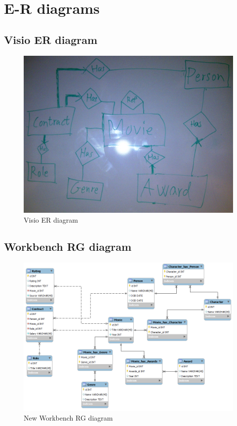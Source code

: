 \section{E-R diagrams}
\subsection{Visio ER diagram}
\begin{figure}[h!]
\includegraphics[width=\textwidth,natwidth=2005,natheight=1506]{illustrations/ER.jpg}
  \caption{Visio ER diagram}
\end{figure}
\subsection{Workbench RG diagram}
\begin{figure}[h!]
\includegraphics[width=\textwidth,natwidth=940,natheight=670]{illustrations/RG.png}
  \caption{New Workbench RG diagram}
\end{figure}
\newpage
